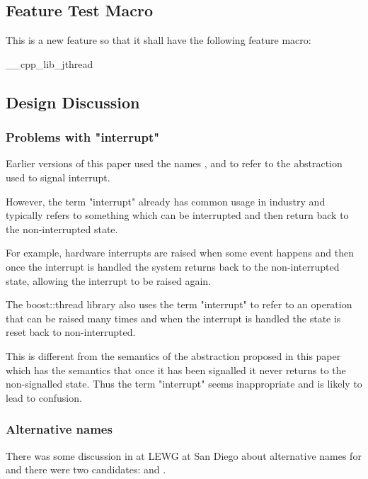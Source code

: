 \subsection*{Feature Test Macro}

This is a new feature so that it shall have the following feature macro:
\begin{codeblock}
	__cpp_lib_jthread
\end{codeblock}



\subsection*{Design Discussion}

\subsubsection*{Problems with "interrupt"}

Earlier versions of this paper used the names ,
 and  to refer to the
abstraction used to signal interrupt.

However, the term "interrupt" already has common usage in industry and
typically refers to something which can be interrupted and then return
back to the non-interrupted state.

For example, hardware interrupts are raised when some event happens and then
once the interrupt is handled the system returns back to the non-interrupted
state, allowing the interrupt to be raised again.

The boost::thread library also uses the term "interrupt" to refer to an operation
that can be raised many times and when the interrupt is handled the state is
reset back to non-interrupted.

This is different from the semantics of the abstraction proposed in this paper 
which has the semantics that once it has been signalled it never returns to
the non-signalled state. Thus the term "interrupt" seems inappropriate and is
likely to lead to confusion.

\subsubsection*{Alternative names}

There was some discussion in at LEWG at San Diego about alternative names
for  and there were two candidates:
 and .


